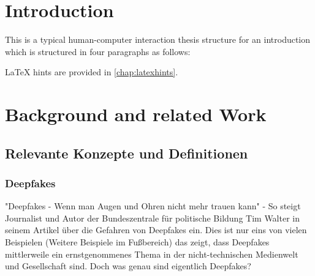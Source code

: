 %
%


\chapter{Introduction}
\label{sec:introduction}

This is a typical human-computer interaction thesis structure for an introduction which is structured in four paragraphs as follows:




LaTeX hints are provided in \autoref{chap:latexhints}.

\chapter{Background and related Work}
\section{Relevante Konzepte und Definitionen}
\subsection{Deepfakes}
"Deepfakes - Wenn man Augen und Ohren nicht mehr trauen kann" \cite{bildungDeepfakesWennMan2023} - So steigt Journalist und Autor der Bundeszentrale für politische Bildung Tim Walter in seinem Artikel über die Gefahren von Deepfakes ein. 
Dies ist nur eins von vielen Beispielen (Weitere Beispiele im Fußbereich) das zeigt, dass Deepfakes mittlerweile ein ernstgenommenes Thema in der nicht-technischen Medienwelt und Gesellschaft sind. 
Doch was genau sind eigentlich Deepfakes? 

